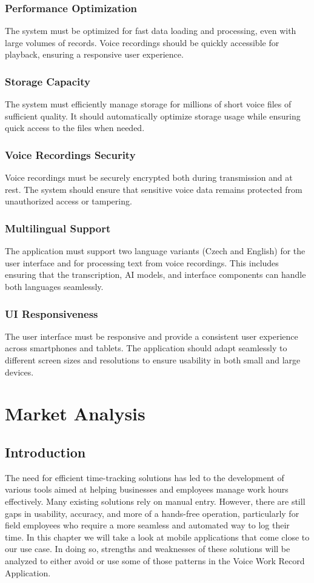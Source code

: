 \documentclass[
  digital,     %
  oneside,     %
  nosansbold,  %
  nocolorbold, %
  lof,         %
  lot,         %
]{fithesis4}
\begin{document}
\subsection{Performance Optimization}  
The system must be optimized for fast data loading and processing, even with large volumes of records. Voice recordings should be quickly accessible for playback, ensuring a responsive user experience.

\subsection{Storage Capacity}  
The system must efficiently manage storage for millions of short voice files of sufficient quality. It should automatically optimize storage usage while ensuring quick access to the files when needed.

\subsection{Voice Recordings Security}  
Voice recordings must be securely encrypted both during transmission and at rest. The system should ensure that sensitive voice data remains protected from unauthorized access or tampering.

\subsection{Multilingual Support}  
The application must support two language variants (Czech and English) for the user interface and for processing text from voice recordings. This includes ensuring that the transcription, \gls{AI} models, and interface components can handle both languages seamlessly.

\subsection{UI Responsiveness}  
The user interface must be responsive and provide a consistent user experience across smartphones and tablets. The application should adapt seamlessly to different screen sizes and resolutions to ensure usability in both small and large devices.

\chapter{Market Analysis}

\section{Introduction}
The need for efficient time-tracking solutions has led to the development of various tools aimed at helping businesses and employees manage work hours effectively. Many existing solutions rely on manual entry. However, there are still gaps in usability, accuracy, and more of a hands-free operation, particularly for field employees who require a more seamless and automated way to log their time. In this chapter we will take a look at mobile applications that come close to our use case. In doing so, strengths and weaknesses of these solutions will be analyzed to either avoid or use some of those patterns in the Voice Work Record Application.
\end{document}
